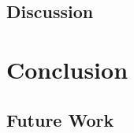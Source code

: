\documentclass[cic,tc,english]{iiufrgs}
\begin{document}
    \section{Discussion}
        \label{sec:discussion}


\chapter{Conclusion}
    \label{chap:conclusion}

    \section{Future Work}
        \label{sec:futurework}






\end{document}
